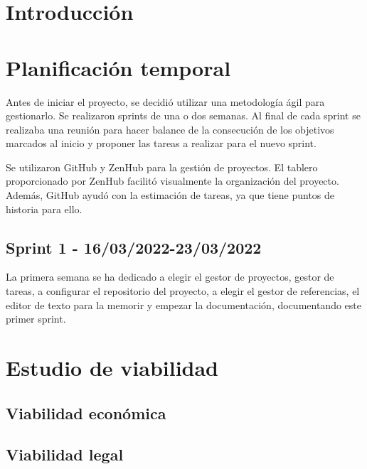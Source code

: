 
\section{Introducción}

\section{Planificación temporal}
Antes de iniciar el proyecto, se decidió utilizar una metodología ágil para gestionarlo.
Se realizaron sprints de una o dos semanas. Al final de cada sprint se realizaba una reunión para hacer balance de la consecución de los objetivos marcados al inicio y proponer las tareas a realizar para el nuevo sprint.

Se utilizaron GitHub y ZenHub para la gestión de proyectos. El tablero proporcionado por ZenHub facilitó visualmente la organización del proyecto. Además, GitHub ayudó con la estimación de tareas, ya que tiene puntos de historia para ello.

\subsection{Sprint 1 - 16/03/2022-23/03/2022}
La primera semana se ha dedicado a elegir el gestor de proyectos, gestor de tareas, a configurar el repositorio del proyecto, a elegir el gestor de referencias, el editor de texto para la memorir y empezar la documentación, documentando este primer sprint.

\section{Estudio de viabilidad}

\subsection{Viabilidad económica}

\subsection{Viabilidad legal}


